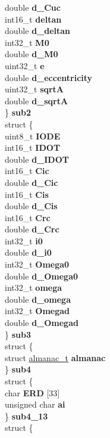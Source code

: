 \begin{DoxyCompactItemize}
{\begin{tabbing}
\>\>double {\bfseries d\_Cuc}\\
\>\>int16\_t {\bfseries deltan}\\
\>\>double {\bfseries d\_deltan}\\
\>\>int32\_t {\bfseries M0}\\
\>\>double {\bfseries d\_M0}\\
\>\>uint32\_t {\bfseries e}\\
\>\>double {\bfseries d\_eccentricity}\\
\>\>uint32\_t {\bfseries sqrtA}\\
\>\>double {\bfseries d\_sqrtA}\\
\>\} {\bfseries sub2}\\
\>struct \{\\
\>\>uint8\_t {\bfseries IODE}\\
\>\>int16\_t {\bfseries IDOT}\\
\>\>double {\bfseries d\_IDOT}\\
\>\>int16\_t {\bfseries Cic}\\
\>\>double {\bfseries d\_Cic}\\
\>\>int16\_t {\bfseries Cis}\\
\>\>double {\bfseries d\_Cis}\\
\>\>int16\_t {\bfseries Crc}\\
\>\>double {\bfseries d\_Crc}\\
\>\>int32\_t {\bfseries i0}\\
\>\>double {\bfseries d\_i0}\\
\>\>int32\_t {\bfseries Omega0}\\
\>\>double {\bfseries d\_Omega0}\\
\>\>int32\_t {\bfseries omega}\\
\>\>double {\bfseries d\_omega}\\
\>\>int32\_t {\bfseries Omegad}\\
\>\>double {\bfseries d\_Omegad}\\
\>\} {\bfseries sub3}\\
\>struct \{\\
\>\>struct \hyperlink{structalmanac__t}{almanac\_t} {\bfseries almanac}\\
\>\} {\bfseries sub4}\\
\>struct \{\\
\>\>char {\bfseries ERD} \mbox{[}33\mbox{]}\\
\>\>unsigned char {\bfseries ai}\\
\>\} {\bfseries sub4\_13}\\
\>struct \{\\

\end{tabbing}}
\end{DoxyCompactItemize}
